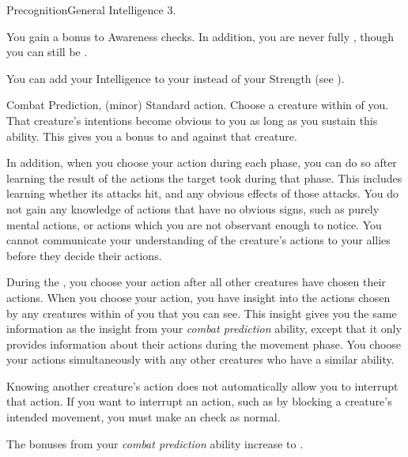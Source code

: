     \begin{feat}{Precognition}{General}
        \featpre Intelligence 3.

         You gain a  bonus to Awareness checks.
        In addition, you are never fully \unaware, though you can still be \partiallyunaware.

         You can add your Intelligence to your  instead of your Strength (see ).

        \begin{sustainability}{Combat Prediction}{,  (minor)}
            \abilityusagetime Standard action.
            \rankline
            Choose a creature within \medrange of you.
            That creature's intentions become obvious to you as long as you sustain this ability.
            This gives you a  bonus to  and  against that creature.

            In addition, when you choose your action during each phase, you can do so after learning the result of the actions the target took during that phase.
            This includes learning whether its attacks hit, and any obvious effects of those attacks.
            You do not gain any knowledge of actions that have no obvious signs, such as purely mental actions, or actions which you are not observant enough to notice.
            You cannot communicate your understanding of the creature's actions to your allies before they decide their actions.
        \end{sustainability}

         During the , you choose your action after all other creatures have chosen their actions.
        When you choose your action, you have insight into the actions chosen by any creatures within \longrange of you that you can see.
        This insight gives you the same information as the insight from your \textit{combat prediction} ability, except that it only provides information about their actions during the movement phase.
        You choose your actions simultaneously with any other creatures who have a similar ability.

        Knowing another creature's action does not automatically allow you to interrupt that action.
        If you want to interrupt an action, such as by blocking a creature's intended movement, you must make an  check as normal.

         The bonuses from your \textit{combat prediction} ability increase to .
    \end{feat}

